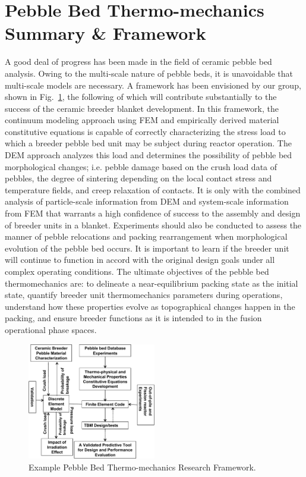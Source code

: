 \section{Pebble Bed Thermo-mechanics Summary \& Framework}
A good deal of progress has been made in the field of ceramic pebble bed analysis. Owing to the multi-scale nature of pebble beds, it is unavoidable that multi-scale models are necessary. A framework has been envisioned by our group, shown in Fig.~\ref{fig:framework}, the following of which will contribute substantially to the success of the ceramic breeder blanket development. In this framework, the continuum modeling approach using FEM and empirically derived material constitutive equations is capable of correctly characterizing the stress load to which a breeder pebble bed unit may be subject during reactor operation. The DEM approach analyzes this load and determines the possibility of pebble bed morphological changes; i.e. pebble damage based on the crush load data of pebbles, the degree of sintering depending on the local contact stress and temperature fields, and creep relaxation of contacts. It is only with the combined analysis of particle-scale information from DEM and system-scale information from FEM that warrants a high confidence of success to the assembly and design of breeder units in a blanket.  Experiments should also be conducted to assess the manner of pebble relocations and packing rearrangement when morphological evolution of the pebble bed occurs. It is important to learn if the breeder unit will continue to function in accord with the original design goals under all complex operating conditions.  The ultimate objectives of the pebble bed thermomechanics are: to delineate a near-equilibrium packing state as the initial state, quantify breeder unit thermomechanics parameters during operations, understand how these properties evolve as topographical changes happen in the packing, and ensure breeder functions as it is intended to in the fusion operational phase spaces.

\begin{figure}[t!]
	\begin{center}
	\includegraphics[width=0.5\textwidth]{chapters/figures/Fig-11}
	\caption{Example Pebble Bed Thermo-mechanics Research Framework.}
	\label{fig:framework}
	\end{center}
\end{figure}

